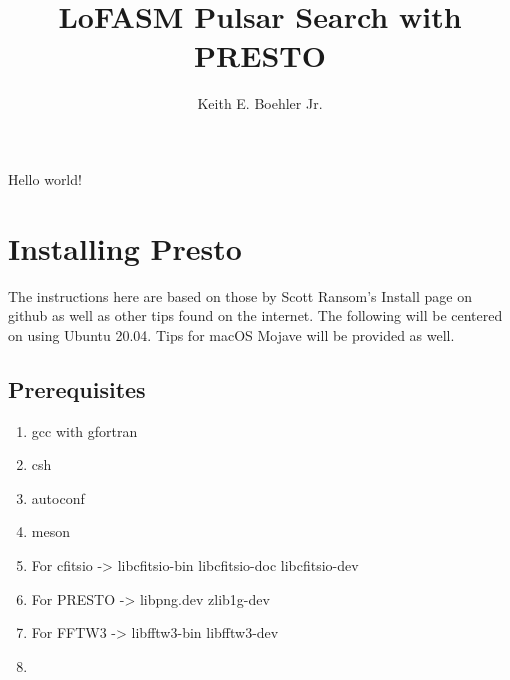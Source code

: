 \documentclass{article}
\title{LoFASM Pulsar Search with PRESTO}
\author{Keith E. Boehler Jr.}
\date{}
\begin{document}
\maketitle
   Hello world!
   
\section{Installing Presto}
The instructions here are based on those by Scott Ransom's Install page on github as well as other tips found on the internet. The following will be centered on using Ubuntu 20.04. Tips for macOS Mojave will be provided as well. 
\subsection{Prerequisites}
\begin{enumerate}
   	\item gcc with gfortran
   	\item csh
   	\item autoconf
   	\item meson
    \item For cfitsio -> libcfitsio-bin libcfitsio-doc libcfitsio-dev
    \item For PRESTO -> libpng.dev zlib1g-dev
    \item For FFTW3 -> libfftw3-bin libfftw3-dev
    \item 
\end{enumerate}
   
\end{document}
